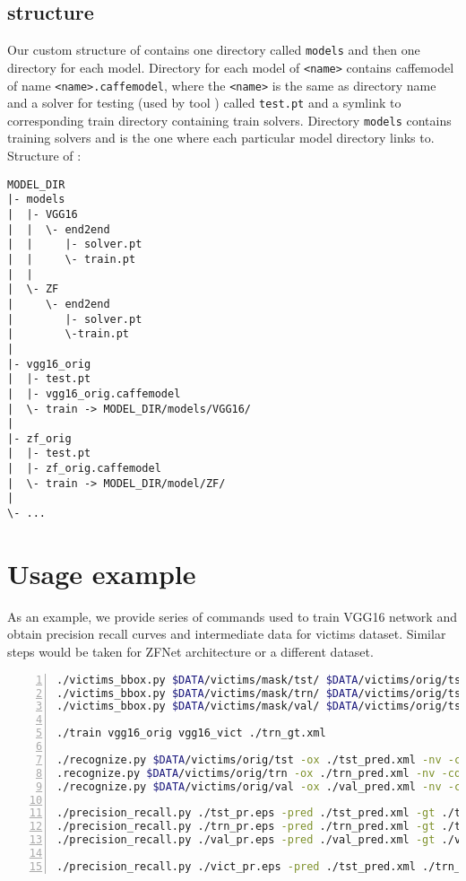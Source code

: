 \subsection{ structure} \label{models}
Our custom structure of  contains one directory called \texttt{models} and then one directory for each model. Directory for each model of \texttt{<name>} contains caffemodel of name \texttt{<name>.caffemodel}, where the \texttt{<name>} is the same as directory name and a solver for testing (used by tool \hyperref[rec]{}) called \texttt{test.pt} and a symlink to corresponding train directory containing train solvers. Directory \texttt{models} contains training solvers and is the one where each particular model directory links to.
\newpage
Structure of :
\begin{lstlisting}[numbers=none]
MODEL_DIR
|- models
|  |- VGG16
|  |  \- end2end
|  |     |- solver.pt
|  |     \- train.pt
|  |
|  \- ZF
|     \- end2end
|        |- solver.pt
|        \-train.pt
|
|- vgg16_orig
|  |- test.pt
|  |- vgg16_orig.caffemodel
|  \- train -> MODEL_DIR/models/VGG16/
|
|- zf_orig
|  |- test.pt
|  |- zf_orig.caffemodel
|  \- train -> MODEL_DIR/model/ZF/
|
\- ...
\end{lstlisting}

\section{Usage example}

As an example, we provide series of commands used to train VGG16 network and obtain precision recall curves and intermediate data for victims dataset. Similar steps would be taken for ZFNet architecture or a different dataset.

\begin{lstlisting}[language=bash, numbers=left]
./victims_bbox.py $DATA/victims/mask/tst/ $DATA/victims/orig/tst/ ./tst_gt.xml
./victims_bbox.py $DATA/victims/mask/trn/ $DATA/victims/orig/tst/ ./trn_gt.xml
./victims_bbox.py $DATA/victims/mask/val/ $DATA/victims/orig/tst/ ./val_gt.xml

./train vgg16_orig vgg16_vict ./trn_gt.xml

./recognize.py $DATA/victims/orig/tst -ox ./tst_pred.xml -nv -conf 0.1 -net vgg16_vict -t
.recognize.py $DATA/victims/orig/trn -ox ./trn_pred.xml -nv -conf 0.1 -net vgg16_vict -t
./recognize.py $DATA/victims/orig/val -ox ./val_pred.xml -nv -conf 0.1 -net vgg16_vict -t

./precision_recall.py ./tst_pr.eps -pred ./tst_pred.xml -gt ./tst_gt.xml
./precision_recall.py ./trn_pr.eps -pred ./trn_pred.xml -gt ./trn_gt.xml
./precision_recall.py ./val_pr.eps -pred ./val_pred.xml -gt ./val_gt.xml

./precision_recall.py ./vict_pr.eps -pred ./tst_pred.xml ./trn_pred.xml ./val_pred.xml -gt ./tst_gt.xml ./trn_gt.xml ./val_gt.xml -cls
\end{lstlisting}
